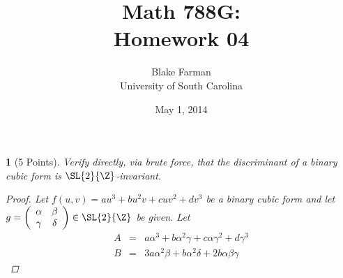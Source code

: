 \documentclass[10pt]{amsart}
\author{Blake Farman\\University of South Carolina}
\title{Math 788G:\\Homework 04}
\date{May 1, 2014}
\begin{document}
\maketitle

\providecommand{\p}{\mathfrak{p}}
\providecommand{\m}{\mathfrak{m}}
\providecommand{\Deck}[1]{\operatorname{Deck}\left(#1\right)}
\newtheorem{thm}{}
\newtheorem{lem}{Lemma}
\newtheorem{prop}{Proposition}
\theoremstyle{definition}
\newtheorem{defn}{Definition}[thm]

\newcommand{\A}{\mathbb{A}}

\begin{thm}[5 Points]\label{Ex1}
  Verify directly, via brute force, that the discriminant of a binary cubic form is $\SL{2}{\Z}$-invariant.
  \begin{proof}
    Let $f(u,v) = au^3 + bu^2v + cuv^2 + dv^3$ be a binary cubic form and let $g = \left(\begin{array}{cc} \alpha & \beta \\ \gamma & \delta\end{array}\right) \in \SL{2}{\Z}$ be given.
      Let
      \begin{eqnarray*}
        A &=& a\alpha^{3} 
        + b \alpha^{2} \gamma 
        + c \alpha  \gamma^{2} 
        + d \gamma^{3}\\ 
        B &=& 3 a \alpha^{2} \beta 
        + b \alpha^{2}  \delta 
        + 2 b \alpha \beta \gamma 

\end{eqnarray*}
\end{proof}
\end{thm}
\end{document}
